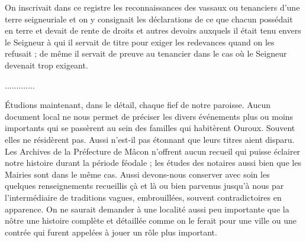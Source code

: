 \documentclass[11pt,a4paper]{report}
\begin{document}
On inscrivait dans ce registre les reconnaissances des vassaux ou tenanciers
d'une terre seigneuriale et on y consignait les déclarations de ce que chacun
possédait en terre et devait de rente de droits et autres devoirs auxquels il
était tenu envers le Seigneur à qui il servait de titre pour exiger les
redevances quand on les refusait ; de même il servait de preuve au tenancier
dans le cas où le Seigneur devenait trop exigeant.

.............

Étudions maintenant, dans le détail, chaque fief de notre paroisse. Aucun
document local ne nous permet de préciser les divers événements plus ou moins
importants qui se passèrent au sein des familles qui habitèrent Ouroux. Souvent
elles ne résidèrent pas. Aussi n'est-il pas étonnant que leurs titres aient
disparu. Les Archives de la Préfecture de Mâcon n'offrent aucun recueil qui
puisse éclairer notre histoire durant la période féodale ; les études des
notaires aussi bien que les Mairies sont dans le même cas. Aussi devons-nous
conserver avec soin les quelques renseignements recueillis çà et là ou bien
parvenus jusqu'à nous par l'intermédiaire de traditions vagues, embrouillées,
souvent contradictoires en apparence. On ne saurait demander à une localité aussi
peu importante que la nôtre une histoire complète et détaillée comme on le ferait
pour une ville ou une contrée qui furent appelées à jouer un rôle plus important.

\endgroup


















\end{document}
